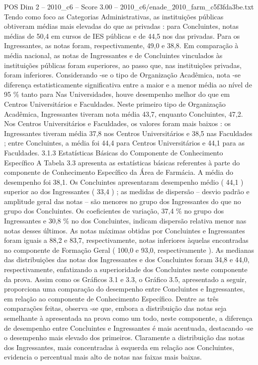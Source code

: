 \begin{textsample}{POS Dim 2 – 2010\_c6 – Score 3.00 – 2010\_c6/enade\_2010\_farm\_c5f3fda3be.txt}
Tendo como foco as Categorias Administrativas, as instituições públicas obtiveram médias mais elevadas do que as privadas : para Concluintes, notas médias de 50,4 em cursos de IES públicas e de 44,5 nos das privadas.
Para os Ingressantes, as notas foram, respectivamente, 49,0 e 38,8.
Em comparação à média nacional, as notas de Ingressantes e de Concluintes vinculados às instituições públicas foram superiores, ao passo que, nas instituições privadas, foram inferiores.
Considerando -se o tipo de Organização Acadêmica, nota -se diferença estatisticamente significativa entre a maior e a menor média ao nível de 95 \% tanto para Nas Universidades, houve desempenho melhor do que em Centros Universitários e Faculdades.
Neste primeiro tipo de Organização Acadêmica, Ingressantes tiveram nota média 43,7, enquanto Concluintes, 47,2.
Nos Centros Universitários e Faculdades, os valores foram mais baixos : os Ingressantes tiveram média 37,8 nos Centros Universitários e 38,5 nas Faculdades ; entre Concluintes, a média foi 44,4 para Centros Universitários e 44,1 para as Faculdades. 3.1.3 Estatísticas Básicas do Componente de Conhecimento Específico A Tabela 3.3 apresenta as estatísticas básicas referentes à parte do componente de Conhecimento Específico da Área de Farmácia.
A média do desempenho foi 38,1.
Os Concluintes apresentaram desempenho médio ( 44,1 ) superior ao dos Ingressantes ( 33,4 ) ; as medidas de dispersão – desvio padrão e amplitude geral das notas – são menores no grupo dos Ingressantes do que no grupo dos Concluintes.
Os coeficientes de variação, 37,4 \% no grupo dos Ingressantes e 30,8 \% no dos Concluintes, indicam dispersão relativa menor nas notas desses últimos.
As notas máximas obtidas por Concluintes e Ingressantes foram iguais a 88,2 e 83,7, respectivamente, notas inferiores àquelas encontradas no componente de Formação Geral ( 100,0 e 93,0, respectivamente ).
As medianas das distribuições das notas dos Ingressantes e dos Concluintes foram 34,8 e 44,0, respectivamente, enfatizando a superioridade dos Concluintes neste componente da prova.
Assim como os Gráficos 3.1 e 3.3, o Gráfico 3.5, apresentado a seguir, proporciona uma comparação do desempenho entre Concluintes e Ingressantes, em relação ao componente de Conhecimento Específico.
Dentre as três comparações feitas, observa -se que, embora a distribuição das notas seja semelhante à apresentada na prova como um todo, neste componente, a diferença de desempenho entre Concluintes e Ingressantes é mais acentuada, destacando -se o desempenho mais elevado dos primeiros.
Claramente a distribuição das notas dos Ingressantes, mais concentradas à esquerda em relação aos Concluintes, evidencia o percentual mais alto de notas nas faixas mais baixas.

\end{textsample}
